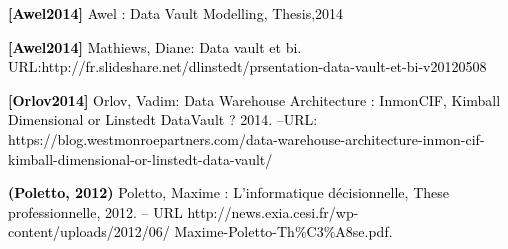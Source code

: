 \documentclass[a4paper,12pt]{report}
\begin{document}
	\item[] \textcolor{black}{
\textbf{[Awel2014]}  Awel : Data Vault Modelling, Thesis,2014}
\\

	\item[] \textcolor{black}{
\textbf{[Awel2014]} Mathiews, Diane: Data vault et bi. URL:http://fr.slideshare.net/dlinstedt/prsentation-data-vault-et-bi-v20120508}
\\

	\item[] \textcolor{black}{
\textbf{[Orlov2014] } Orlov, Vadim: Data Warehouse Architecture : InmonCIF, Kimball Dimensional or Linstedt DataVault ? 2014. –URL: https://blog.westmonroepartners.com/data-warehouse-architecture-inmon-cif-kimball-dimensional-or-linstedt-data-vault/}
\\

	\item[] \textcolor{black}{
\textbf{(Poletto, 2012)} Poletto, Maxime : L’informatique décisionnelle, These professionnelle, 2012. – URL http://news.exia.cesi.fr/wp-content/uploads/2012/06/
Maxime-Poletto-Th\%C3\%A8se.pdf.}
\end{document}

